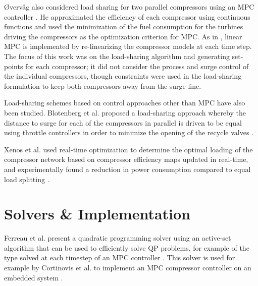Øvervåg also considered load sharing for two parallel compressors using an MPC controller \cite{Oevervaag2013}. 
He approximated the efficiency of each compressor using continuous functions and used the minimization of the fuel consumption for the turbines driving the compressors as the optimization criterion for MPC. 
As in \cite{Smeulers1999}, linear MPC is implemented by re-linearizing the compressor models at each time step.
The focus of this work was on the load-sharing algorithm and generating set-points for each compressor; it did not consider the process and surge control of the individual compressors, though constraints were used in the load-sharing formulation to keep both compressors away from the surge line.

Load-sharing schemes based on control approaches other than MPC have also been studied. 
Blotenberg et al. proposed a load-sharing approach whereby the distance to surge for each of the compressors in parallel is driven to be equal using throttle controllers in order to minimize the opening of the recycle valves \cite{Blotenberg1984}. 

Xenos et al. used real-time optimization to determine the optimal loading of the compressor network based on compressor efficiency maps updated in real-time, and experimentally found a reduction in power consumption compared to equal load splitting \cite{Xenos2015}.






\section{Solvers \& Implementation}

Ferreau et al. present a quadratic programming solver using an active-set algorithm that can be used to efficiently solve QP problems, for example of the type solved at each timestep of an MPC controller \cite{Ferreau2014}. 
This solver is used for example by Cortinovis et al. to implement an MPC compressor controller on an embedded system \cite{Cortinovis2015}. 

